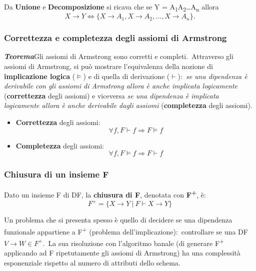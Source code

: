 \noindent Da \textbf{Unione} e \textbf{Decomposizione} si ricava che se Y = A\textsubscript{1}A\textsubscript{2}\dots A\textsubscript{n} allora
\[
	X \rightarrow Y \Leftrightarrow \{X \rightarrow A_1, X \rightarrow A_2, \dots, X \rightarrow A_n\}.
\]

\subsubsection{Correttezza e completezza degli assiomi di Armstrong}

\textbf{\textit{Teorema}}\quad Gli assiomi di Armstrong sono corretti e completi.\
Attraverso gli assiomi di Armstrong, si può mostrare l'equivalenza della nozione di \textbf{implicazione logica} ($\models$) e di quella di derivazione ($\vdash$):\ \textit{se una dipendenza è derivabile con gli assiomi di Armstrong allora è anche implicata logicamente} (\textbf{correttezza} degli assiomi) e viceversa \textit{se una dipendenza è implicata logicamente allora è anche derivabile dagli assiomi} (\textbf{completezza} degli assiomi).\

\begin{itemize}
	\item \textbf{Correttezza} degli assiomi:\
	      \[
		      \forall f, F \vdash f \Rightarrow F \models f
	      \]
	\item \textbf{Completezza} degli assiomi:\
	      \[
		      \forall f, F \models f \Rightarrow F \vdash f
	      \]
\end{itemize}

\subsubsection{Chiusura di un insieme F}

\begin{definition}
	Dato un insieme F di DF, la \textbf{chiusura di F}, denotata con \textbf{F\textsuperscript{+}}, è:
	\[
		F^+ = \{ X \rightarrow Y\ |\ F \vdash X \rightarrow Y\}
	\]
\end{definition}

\noindent Un problema che si presenta spesso è quello di decidere se una dipendenza funzionale appartiene a F\textsuperscript{+} (problema dell'implicazione):\ controllare se una DF $V \rightarrow W \in F^+$.\
La sua risoluzione con l'algoritmo banale (di generare F\textsuperscript{+} applicando ad F ripetutamente gli assiomi di Armstrong) ha una complessità esponenziale rispetto al numero di attributi dello schema.\

